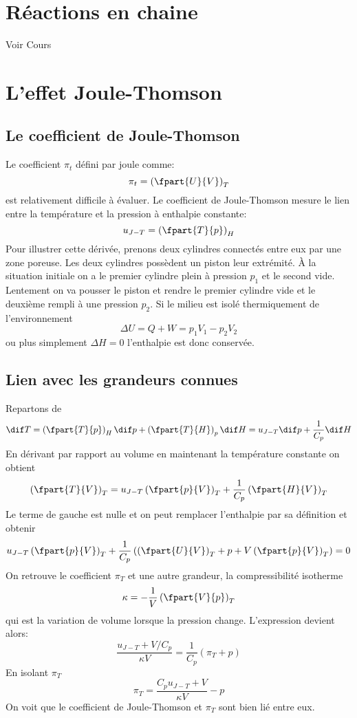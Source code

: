 \section{Réactions en chaine}
Voir Cours

\annexe

\section{L'effet Joule-Thomson}
\subsection{Le coefficient de Joule-Thomson}
Le coefficient $\pi_t$ défini par joule comme:
\[ \pi_t = \left(\fpart{U}{V}\right)_T \]
est relativement difficile à évaluer.
Le coefficient de Joule-Thomson mesure le lien entre la température et
la pression à enthalpie constante:
\[  u_{J-T} = \left(\fpart{T}{p}\right)_H \]
Pour illustrer cette dérivée, prenons deux cylindres connectés
entre eux par une zone poreuse.
Les deux cylindres possèdent un piston leur extrémité.
À la situation initiale on a le premier cylindre plein
à pression $p_1$ et le second vide.
Lentement on va pousser le piston et rendre le premier cylindre vide
et le deuxième rempli à une pression $p_2$.
Si le milieu est isolé thermiquement de l'environnement
\[ \Delta U = Q+ W = p_1V_1-p_2V_2 \]
ou plus simplement $\Delta H = 0$ l'enthalpie est donc conservée.

\subsection{Lien avec les grandeurs connues}
Repartons de
\[ \dif T = \left ( \fpart{T}{p}\right)_H \dif p+
\left ( \fpart{T}{H}\right)_p \dif H = u_{J-T}\dif p+\frac 1{C_p}\dif H \]
En dérivant par rapport au volume en maintenant
la température constante on obtient
\[ \left ( \fpart{T}{V} \right)_T =
  u_{J-T}\left(\fpart{p}{V}\right)_T+
  \frac 1{C_p}\left(\fpart{H}{V}\right)_T \]
Le terme de gauche est nulle et on peut remplacer
l'enthalpie par sa définition et obtenir
\[ u_{J-T}\left(\fpart{p}{V}\right)_T+
  \frac 1{C_p} \left( \left(\fpart{U}{V}\right)_T+p+
  V\left(\fpart{p}{V}\right)_T\right) = 0 \]
On retrouve le coefficient $\pi_T$ et une autre grandeur,
la compressibilité isotherme
\[  \kappa = - \frac 1V \left(\fpart{V}{p}\right)_T \]
qui est la variation de volume lorsque la pression change.
L'expression devient alors:
\[ \frac{u_{J-T}+V/C_p}{\kappa V} = \frac 1{C_p}(\pi_T+p) \]
En isolant $\pi_T$
\[  \pi_T = \frac {C_p u_{J-T}+V}{\kappa V}-p \]
On voit que le coefficient de Joule-Thomson et $\pi_T$ sont bien lié entre eux.

